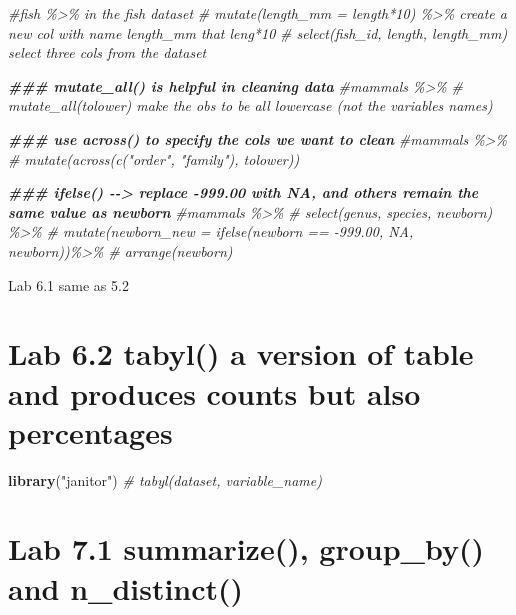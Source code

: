 \documentclass[
]{article}
\newenvironment{Shaded}{\begin{snugshade}}{\end{snugshade}}
\newcommand{\CommentTok}[1]{\textcolor[rgb]{0.56,0.35,0.01}{\textit{#1}}}
\newcommand{\DocumentationTok}[1]{\textcolor[rgb]{0.56,0.35,0.01}{\textbf{\textit{#1}}}}
\newcommand{\FunctionTok}[1]{\textcolor[rgb]{0.13,0.29,0.53}{\textbf{#1}}}
\newcommand{\NormalTok}[1]{#1}
\newcommand{\StringTok}[1]{\textcolor[rgb]{0.31,0.60,0.02}{#1}}
\begin{document}
\begin{Shaded}
\begin{Highlighting}[]
\CommentTok{\#fish \%\textgreater{}\%  in the fish dataset }
\CommentTok{\#  mutate(length\_mm = length*10) \%\textgreater{}\% create a new col with name length\_mm that leng*10}
\CommentTok{\#  select(fish\_id, length, length\_mm) select three cols from the dataset}



\DocumentationTok{\#\#\# mutate\_all() is helpful in cleaning data }
\CommentTok{\#mammals \%\textgreater{}\%}
\CommentTok{\#  mutate\_all(tolower) make the obs to be all lowercase (not the variables names)}


\DocumentationTok{\#\#\# use across() to specify the cols we want to clean}
\CommentTok{\#mammals \%\textgreater{}\% }
\CommentTok{\#  mutate(across(c("order", "family"), tolower))}



\DocumentationTok{\#\#\# ifelse() {-}{-}\textgreater{} replace {-}999.00 with NA, and others remain the same value as newborn}
\CommentTok{\#mammals \%\textgreater{}\% }
\CommentTok{\#  select(genus, species, newborn) \%\textgreater{}\%}
\CommentTok{\#  mutate(newborn\_new = ifelse(newborn == {-}999.00, NA, newborn))\%\textgreater{}\% }
\CommentTok{\#  arrange(newborn)}
\end{Highlighting}
\end{Shaded}

Lab 6.1 same as 5.2

\hypertarget{lab-6.2-tabyl-a-version-of-table-and-produces-counts-but-also-percentages}{%
\section{Lab 6.2 tabyl() a version of table and produces counts but also
percentages}\label{lab-6.2-tabyl-a-version-of-table-and-produces-counts-but-also-percentages}}

\begin{Shaded}
\begin{Highlighting}[]
\FunctionTok{library}\NormalTok{(}\StringTok{"janitor"}\NormalTok{)}
\CommentTok{\# tabyl(dataset, variable\_name)}
\end{Highlighting}
\end{Shaded}

\hypertarget{lab-7.1-summarize-group_by-and-n_distinct}{%
\section{Lab 7.1 summarize(), group\_by() and
n\_distinct()}\label{lab-7.1-summarize-group_by-and-n_distinct}}
\end{document}
